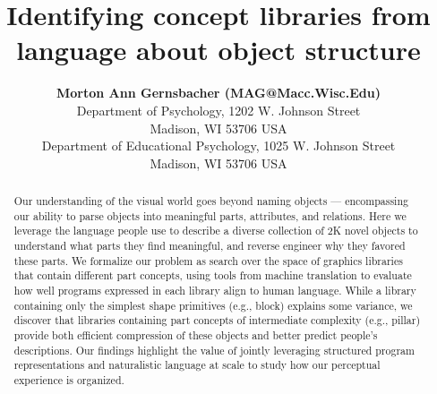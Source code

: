 \documentclass[10pt,letterpaper]{article}
\title{Identifying concept libraries from language about object structure}
\author{{\large \bf Morton Ann Gernsbacher (MAG@Macc.Wisc.Edu)} \\
  Department of Psychology, 1202 W. Johnson Street \\
  Madison, WI 53706 USA
  \AND {\large \bf Sharon J.~Derry (SDJ@Macc.Wisc.Edu)} \\
  Department of Educational Psychology, 1025 W. Johnson Street \\
  Madison, WI 53706 USA}
\begin{document}
\maketitle


\begin{abstract} 
Our understanding of the visual world goes beyond naming objects --- encompassing our ability to parse objects into meaningful parts, attributes, and relations. 
Here we leverage the language people use to describe a diverse collection of 2K novel objects to understand what parts they find meaningful, and reverse engineer why they favored these parts. 
We formalize our problem as search over the space of graphics libraries that contain different part concepts, using tools from machine translation
to evaluate how well programs expressed in each library align to human language.
While a library containing only the simplest shape primitives (e.g., block) explains some variance, we discover that libraries containing part concepts of intermediate complexity (e.g., pillar) provide both efficient compression of these objects and better predict people's descriptions.
Our findings highlight the value of jointly leveraging structured program representations and naturalistic language at scale to study how our perceptual experience is organized.



\end{abstract}
\end{document}
